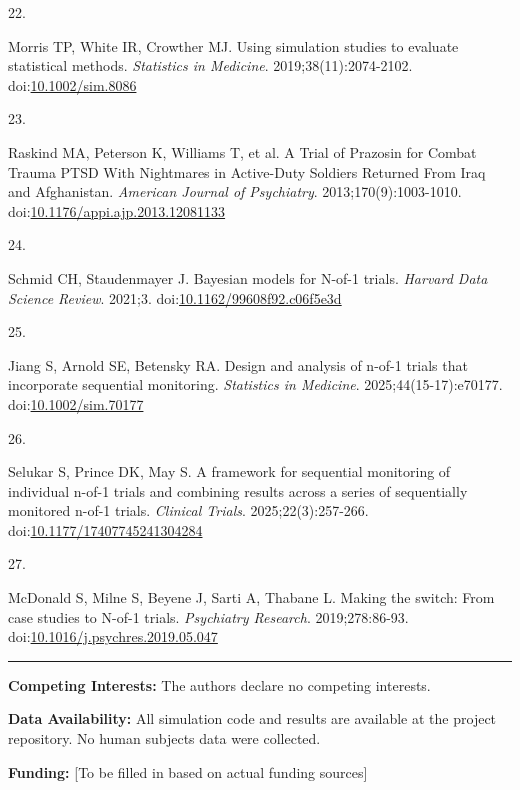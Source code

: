 \documentclass[
  11pt,
]{article}
\newlength{\cslhangindent}
\newlength{\csllabelwidth}
\newenvironment{CSLReferences}[2] %
 {\begin{list}{}{%
  \setlength{\itemindent}{0pt}
  \setlength{\leftmargin}{0pt}
  \setlength{\parsep}{0pt}
  \ifodd #1
   \setlength{\leftmargin}{\cslhangindent}
   \setlength{\itemindent}{-1\cslhangindent}
  \fi
  \setlength{\itemsep}{#2\baselineskip}}}
 {\end{list}}
\newcommand{\CSLLeftMargin}[1]{\parbox[t]{\csllabelwidth}{\strut#1\strut}}
\newcommand{\CSLRightInline}[1]{\parbox[t]{\linewidth - \csllabelwidth}{\strut#1\strut}}
\begin{document}
\begin{CSLReferences}{0}{1}
\CSLLeftMargin{22. }%
\CSLRightInline{Morris TP, White IR, Crowther MJ. Using simulation
studies to evaluate statistical methods. \emph{Statistics in Medicine}.
2019;38(11):2074-2102.
doi:\href{https://doi.org/10.1002/sim.8086}{10.1002/sim.8086}}

\CSLLeftMargin{23. }%
\CSLRightInline{Raskind MA, Peterson K, Williams T, et al. A {Trial} of
{Prazosin} for {Combat Trauma PTSD With Nightmares} in {Active-Duty
Soldiers Returned From Iraq} and {Afghanistan}. \emph{American Journal
of Psychiatry}. 2013;170(9):1003-1010.
doi:\href{https://doi.org/10.1176/appi.ajp.2013.12081133}{10.1176/appi.ajp.2013.12081133}}

\CSLLeftMargin{24. }%
\CSLRightInline{Schmid CH, Staudenmayer J. Bayesian models for {N-of-1}
trials. \emph{Harvard Data Science Review}. 2021;3.
doi:\href{https://doi.org/10.1162/99608f92.c06f5e3d}{10.1162/99608f92.c06f5e3d}}

\CSLLeftMargin{25. }%
\CSLRightInline{Jiang S, Arnold SE, Betensky RA. Design and analysis of
n-of-1 trials that incorporate sequential monitoring. \emph{Statistics
in Medicine}. 2025;44(15-17):e70177.
doi:\href{https://doi.org/10.1002/sim.70177}{10.1002/sim.70177}}

\CSLLeftMargin{26. }%
\CSLRightInline{Selukar S, Prince DK, May S. A framework for sequential
monitoring of individual n-of-1 trials and combining results across a
series of sequentially monitored n-of-1 trials. \emph{Clinical Trials}.
2025;22(3):257-266.
doi:\href{https://doi.org/10.1177/17407745241304284}{10.1177/17407745241304284}}

\CSLLeftMargin{27. }%
\CSLRightInline{McDonald S, Milne S, Beyene J, Sarti A, Thabane L.
Making the switch: {From} case studies to {N-of-1} trials.
\emph{Psychiatry Research}. 2019;278:86-93.
doi:\href{https://doi.org/10.1016/j.psychres.2019.05.047}{10.1016/j.psychres.2019.05.047}}

\end{CSLReferences}

\begin{center}\rule{0.5\linewidth}{0.5pt}\end{center}

\textbf{Competing Interests:} The authors declare no competing
interests.

\textbf{Data Availability:} All simulation code and results are
available at the project repository. No human subjects data were
collected.

\textbf{Funding:} {[}To be filled in based on actual funding sources{]}
\end{document}
